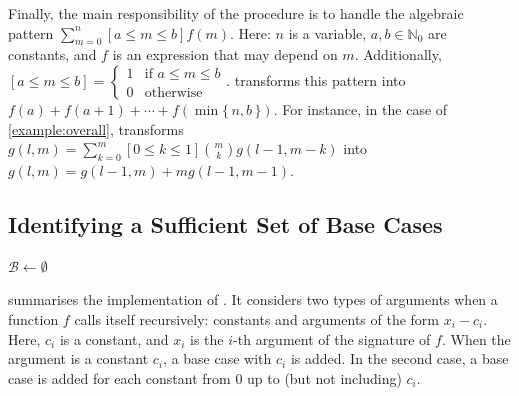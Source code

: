 \documentclass[a4paper,UKenglish,cleveref, autoref, thm-restate]{lipics-v2021}
\begin{document}
Finally, the main responsibility of the \Simplify procedure is to handle the
algebraic pattern $\sum_{m=0}^{n}[a \le m \le b] f(m)$. Here: $n$ is a variable,
$a, b \in \mathbb{N}_{0}$ are constants, and $f$ is an expression that may
depend on $m$. Additionally, $[a \le m \le b] = \begin{cases}
  1 & \text{if $a \le m \le b$} \\
  0 & \text{otherwise}
\end{cases}$.
\Simplify transforms this pattern into
$f(a) + f(a+1) + \cdots + f(\min\{\, n, b \,\})$. For instance, in the case of
\cref{example:overall}, \Simplify transforms
$g(l, m) = \sum_{k=0}^{m}[0 \le k \le 1]\binom{m}{k}g(l-1, m-k)$ into
$g(l, m) = g(l-1, m) + mg(l-1, m-1)$.

\subsection{Identifying a Sufficient Set of Base Cases}\label{sec:identifying}

\begin{algorithm}[t]
  \caption{\protect{}}\label{alg:findbasecases}

  $\mathcal{B} \gets \emptyset$\;
\end{algorithm}

 summarises the implementation of \FindBaseCases. It
considers two types of arguments when a function $f$ calls itself recursively:
constants and arguments of the form $x_{i} - c_{i}$. Here, $c_{i}$ is a
constant, and $x_{i}$ is the $i$-th argument of the signature of $f$. When the
argument is a constant $c_{i}$, a base case with $c_{i}$ is added. In the second
case, a base case is added for each constant from $0$ up to (but not including)
$c_{i}$.
\end{document}
